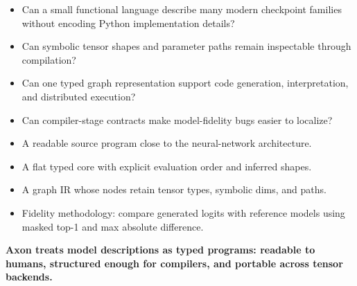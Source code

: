 \documentclass{article}
\begin{document}
\vspace{7mm}

\noindent
\begin{minipage}[t]{0.49\linewidth}
\begin{tcolorbox}[posterbox,title={Scientific Questions}]
{\raggedright\fontsize{21}{27}\selectfont
\begin{itemize}
\setlength\itemsep{1mm}
\item Can a small functional language describe many modern checkpoint families without encoding Python implementation details?
\item Can symbolic tensor shapes and parameter paths remain inspectable through compilation?
\item Can one typed graph representation support code generation, interpretation, and distributed execution?
\item Can compiler-stage contracts make model-fidelity bugs easier to localize?
\end{itemize}
}
\end{tcolorbox}
\end{minipage}
\hfill
\begin{minipage}[t]{0.49\linewidth}
\begin{tcolorbox}[posterbox,title={What Attendees Can Inspect}]
{\raggedright\fontsize{21}{27}\selectfont
\begin{itemize}
\setlength\itemsep{1mm}
\item A readable source program close to the neural-network architecture.
\item A flat typed core with explicit evaluation order and inferred shapes.
\item A graph IR whose nodes retain tensor types, symbolic dims, and paths.
\item Fidelity methodology: compare generated logits with reference models using masked top-1 and max absolute difference.
\end{itemize}
}
\end{tcolorbox}
\end{minipage}

\vfill
\begin{center}
{\fontsize{24}{29}\selectfont\bfseries Axon treats model descriptions as typed programs: readable to humans, structured enough for compilers, and portable across tensor backends.}
\end{center}
\end{document}
